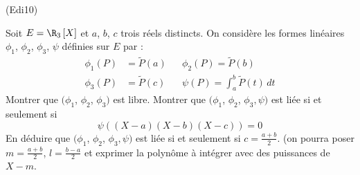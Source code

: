\begin{tiny}(Edi10)\end{tiny}
Soit $E=\R_{3}\left[ X\right]$ et $a$, $b$, $c$ trois r{\'e}els distincts. On consid{\`e}re les formes lin{\'e}aires
 $\phi _{1}$, $\phi _{2}$, $\phi _{3}$, $\psi $ d{\'e}finies sur $E$ par :
\begin{align*}
\phi_{1}(P) &= \widetilde{P}(a)&  & \phi _{2}(P)=\widetilde{P}(b)\\
\phi _{3}(P)&= \widetilde{P}(c)& & \psi(P)=\int_{a}^{b}\widetilde{P}(t)\,dt
\end{align*}
Montrer que $(\phi _{1}$, $\phi _{2}$, $\phi _{3})$ est libre.\newline
Montrer que $(\phi _{1}$, $\phi _{2}$, $\phi_{3},\psi )$ est li{\'e}e si et seulement si
\begin{displaymath}
 \psi ((X-a)(X-b)(X-c))=0
\end{displaymath}
En d{\'e}duire que $(\phi _{1}$, $\phi _{2}$, $\phi _{3},\psi )$ est li{\'e}e si et seulement si $c=\frac{a+b}{2}$. (on pourra poser $m=\frac{a+b}{2}$, $l=\frac{b-a}{2}$ et exprimer la polynôme à intégrer avec des puissances de $X-m$.
